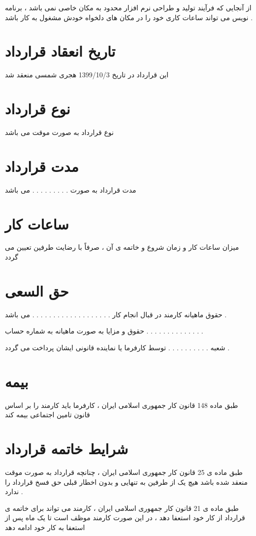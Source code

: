 \documentclass[12pt]{article}
\begin{document}
از آنجایی که فرآیند تولید و طراحی نرم افزار محدود به مکان خاصی نمی باشد ، برنامه نویس می تواند ساعات کاری خود را در مکان های دلخواه خودش مشغول به کار باشد .


\section{تاریخ انعقاد قرارداد}

این قرارداد در تاریخ 1399/10/3 هجری شمسی منعقد شد

\section{نوع قرارداد}


نوع قرارداد به صورت موقت می باشد


\section{مدت قرارداد}


مدت قرارداد به صورت . . . . . . . . . می باشد


\section{ساعات کار}

میزان ساعات کار و زمان شروع و خاتمه ی آن ، صرفاً با رضایت طرفین تعیین می گردد


\section{حق السعی}

حقوق ماهیانه کارمند در قبال انجام کار . . . . . . . . . . . . . . . . . . . می باشد .

حقوق و مزایا به صورت ماهیانه به شماره حساب  . . . . . . . . . . . . . .

شعبه . . . . . . . . . . توسط کارفرما یا نماینده قانونی ایشان پرداخت می گردد .


\section{بیمه}

طبق ماده 148 قانون کار جمهوری اسلامی ایران ، کارفرما باید کارمند را بر اساس قانون تامین اجتماعی بیمه کند 




\section{شرایط خاتمه قرارداد}



طبق ماده ی 25 قانون کار جمهوری اسلامی ایران ، چنانچه قرارداد به صورت موقت منعقد شده باشد هیچ یک از طرفین به تنهایی و بدون اخطار قبلی حق فسخ قرارداد را ندارد .

طبق ماده ی 21 قانون کار جمهوری اسلامی ایران ، کارمند می تواند برای خاتمه ی قرارداد از کار خود استعفا دهد ، در این صورت کارمند موظف است تا یک ماه پس از استعفا به کار خود ادامه دهد
\end{document}
